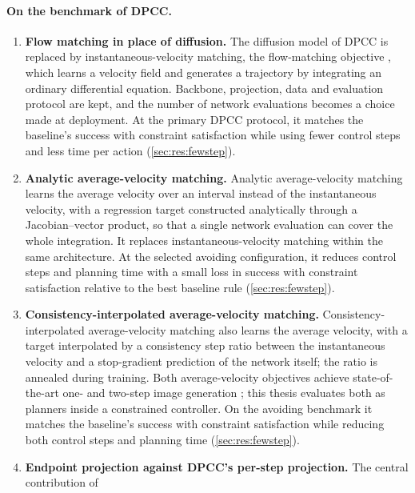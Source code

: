 \paragraph{On the benchmark of \ac{DPCC}.}
\begin{enumerate}
  \item \textbf{Flow matching in place of diffusion.} The diffusion model of \ac{DPCC}
    \parencite{romer2025diffusion} is replaced by instantaneous-velocity matching, the flow-matching
    objective \parencite{lipman2023flow,lipman2024guide}, which learns a velocity field and generates a
    trajectory by integrating an ordinary differential equation. Backbone, projection, data and
    evaluation protocol are kept, and the number of network evaluations becomes a choice made at
    deployment.
    At the primary DPCC protocol, it matches the baseline's success with constraint satisfaction
    while using fewer control steps and less time per action (\autoref{sec:res:fewstep}).
  \item \textbf{Analytic average-velocity matching.} Analytic average-velocity matching
    \parencite{geng2025meanflow} learns the average velocity over an interval instead of the
    instantaneous velocity, with a regression target constructed analytically through a
    Jacobian--vector product, so that a single network evaluation can cover the whole integration. It
    replaces instantaneous-velocity matching within the same architecture.
    At the selected avoiding configuration, it reduces control steps and planning time with a small
    loss in success with constraint satisfaction relative to the best baseline rule
    (\autoref{sec:res:fewstep}).
  \item \textbf{Consistency-interpolated average-velocity matching.} Consistency-interpolated
    average-velocity matching \parencite{zhang2025alphaflow} also learns the average velocity, with a
    target interpolated by a consistency step ratio between the instantaneous velocity and a
    stop-gradient prediction of the network itself; the ratio is annealed during training. Both
    average-velocity objectives achieve state-of-the-art one- and two-step image generation
    \parencite{geng2025meanflow,zhang2025alphaflow}; this thesis evaluates both as planners inside a
    constrained controller.
    On the avoiding benchmark it matches the baseline's success with constraint satisfaction
    while reducing both control steps and planning time (\autoref{sec:res:fewstep}).
  \item \textbf{Endpoint projection against DPCC's per-step projection.} The central contribution of

\end{enumerate}
